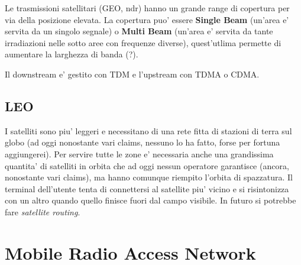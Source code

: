 Le trasmissioni satellitari (GEO, ndr) hanno un grande range di copertura per via della posizione elevata.
La copertura puo' essere \textbf{Single Beam} (un'area e' servita da un singolo segnale) o \textbf{Multi Beam} (un'area e' servita da tante irradiazioni nelle sotto aree con frequenze diverse), quest'utlima permette di aumentare la larghezza di banda (?).

Il downstream e' gestito con TDM e l'upstream con TDMA o CDMA.


\subsection{LEO}

I satelliti sono piu' leggeri e necessitano di una rete fitta di stazioni di terra sul globo (ad oggi nonostante vari claims, nessuno lo ha fatto, forse per fortuna aggiungerei).
Per servire tutte le zone e' necessaria anche una grandissima quantita' di satelliti in orbita che ad oggi nessun operatore garantisce (ancora, nonostante vari claims), ma hanno comunque riempito l'orbita di spazzatura.
Il terminal dell'utente tenta di connettersi al satellite piu' vicino e si risintonizza con un altro quando quello finisce fuori dal campo visibile.
In futuro si potrebbe fare \textit{satellite routing}.

\section{Mobile Radio Access Network}
